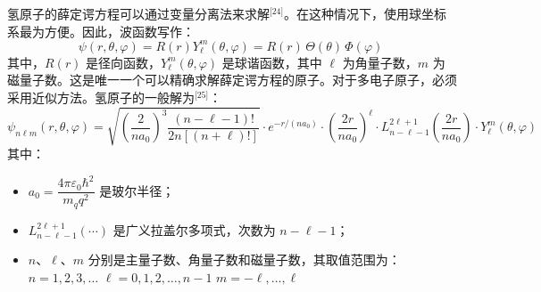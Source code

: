 氢原子的薛定谔方程可以通过变量分离法来求解\(^\text{[24]}\)。在这种情况下，使用球坐标系最为方便。因此，波函数写作：
$$
\psi(r, \theta, \varphi) = R(r) Y_{\ell}^{m}(\theta, \varphi) = R(r)\, \Theta(\theta)\, \Phi(\varphi)~
$$
其中，$R(r)$ 是径向函数，$Y_{\ell}^{m}(\theta, \varphi)$ 是球谐函数，其中 $\ell$ 为角量子数，$m$ 为磁量子数。这是唯一一个可以精确求解薛定谔方程的原子。对于多电子原子，必须采用近似方法。氢原子的一般解为\(^\text{[25]}\)：
$$
\psi_{n\ell m}(r,\theta,\varphi) = \sqrt{\left( \frac{2}{n a_0} \right)^3 \frac{(n - \ell - 1)!}{2n[(n + \ell)!]}} \cdot e^{-r / (n a_0)} \cdot \left( \frac{2r}{n a_0} \right)^\ell \cdot L_{n - \ell - 1}^{2\ell + 1} \left( \frac{2r}{n a_0} \right) \cdot Y_\ell^m(\theta, \varphi)~
$$
其中：
\begin{itemize}
\item $a_0 = \dfrac{4\pi \varepsilon_0 \hbar^2}{m_q q^2}$ 是玻尔半径；
\item $L_{n - \ell - 1}^{2\ell + 1}(\cdots)$ 是广义拉盖尔多项式，次数为 $n - \ell - 1$；
\item $n$、$\ell$、$m$ 分别是主量子数、角量子数和磁量子数，其取值范围为：$n = 1, 2, 3, \dots$ $\ell = 0, 1, 2, \dots, n - 1$ $m = -\ell, \dots, \ell$
\end{itemize}


